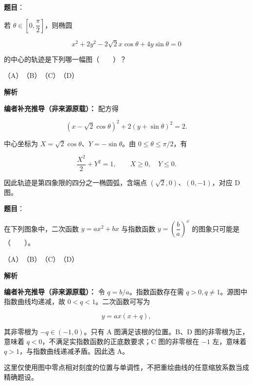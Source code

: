 \begin{answer}

\textbf{题目}：

若 $\theta\in\left[0,\dfrac{\pi}{2}\right]$，则椭圆

\nopagebreak[4]
\[
x^2+2y^2-2\sqrt2x\cos\theta+4y\sin\theta=0
\]

的中心的轨迹是下列哪一幅图\mbox{（　　）}？
\nopagebreak[4]
\begin{center}\end{center}
\nopagebreak[4]
（A）　（B）　（C）　（D）

\textbf{解析}

\textbf{编者补充推导（非来源原载）：} 配方得

\nopagebreak[4]
\[(x-\sqrt2\cos\theta)^2+2(y+\sin\theta)^2=2.\]

中心坐标为 $X=\sqrt2\cos\theta$、$Y=-\sin\theta$。由 $0\le\theta\le\pi/2$，有

\nopagebreak[4]
\[\frac{X^2}{2}+Y^2=1,\qquad X\ge0,\quad Y\le0.\]

因此轨迹是第四象限的四分之一椭圆弧，含端点 $(\sqrt2,0)$、$(0,-1)$，对应 D 图。


\end{answer}
\begin{answer}

\textbf{题目}：

在下列图象中，二次函数 $y=ax^2+bx$ 与指数函数 $y=\left(\dfrac{b}{a}\right)^x$ 的图象只可能是\mbox{（　　）}。
\nopagebreak[4]
\begin{center}\end{center}
\nopagebreak[4]
（A）　（B）　（C）　（D）

\textbf{解析}

\textbf{编者补充推导（非来源原载）：} 令 $q=b/a$。指数函数存在需 $q>0,q\ne1$。源图中指数曲线均递减，故 $0<q<1$。二次函数可写为

\nopagebreak[4]
\[y=ax(x+q),\]

其非零根为 $-q\in(-1,0)$。只有 A 图满足该根的位置。B、D 图的非零根为正，意味着 $q<0$，不满足实指数函数的正底数要求；C 图的非零根在 $-1$ 左，意味着 $q>1$，与指数曲线递减矛盾。因此选 A。

这里仅使用图中零点相对刻度的位置与单调性，不把重绘曲线的任意缩放系数当成精确题设。


\end{answer}

